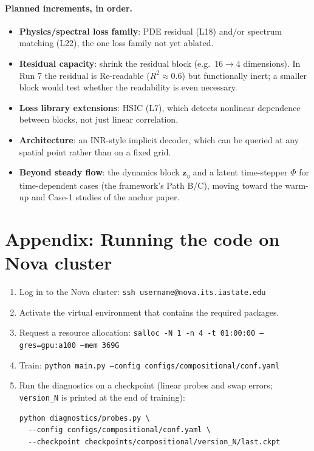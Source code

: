 \documentclass[11pt]{article}
\begin{document}
\paragraph{Planned increments, in order.}
%
\begin{itemize}
  \item \textbf{Physics/spectral loss family}: PDE residual (L18) and/or
        spectrum matching (L22), the one loss family not yet ablated.
  \item \textbf{Residual capacity}: shrink the residual block (e.g.\
        $16 \to 4$ dimensions). In Run 7 the residual is Re-readable
        ($R^2 \approx 0.6$) but functionally inert; a smaller block
        would test whether the readability is even necessary.
  \item \textbf{Loss library extensions}: HSIC (L7), which detects
        nonlinear dependence between blocks, not just linear correlation.
  \item \textbf{Architecture}: an INR-style implicit decoder, which can
        be queried at any spatial point rather than on a fixed grid.
  \item \textbf{Beyond steady flow}: the dynamics block
        $\boldsymbol{z}_{\eta}$ and a latent time-stepper $\Phi$ for
        time-dependent cases (the framework's Path B/C), moving toward
        the warm-up and Case-1 studies of the anchor paper.
\end{itemize}

\newpage

\appendix

\section{Appendix: Running the code on Nova cluster}

\begin{enumerate}
  \item Log in to the Nova cluster:
        \texttt{ssh username@nova.its.iastate.edu}
  \item Activate the virtual environment that contains the required
        packages.
  \item Request a resource allocation:
        \texttt{salloc -N 1 -n 4 -t 01:00:00 --gres=gpu:a100 --mem 369G}
  \item Train:
        \texttt{python main.py --config configs/compositional/conf.yaml}
  \item Run the diagnostics on a checkpoint (linear probes and swap
        errors; \texttt{version\_N} is printed at the end of training):
        \begin{verbatim}
python diagnostics/probes.py \
  --config configs/compositional/conf.yaml \
  --checkpoint checkpoints/compositional/version_N/last.ckpt
        \end{verbatim}
\end{enumerate}
\end{document}
